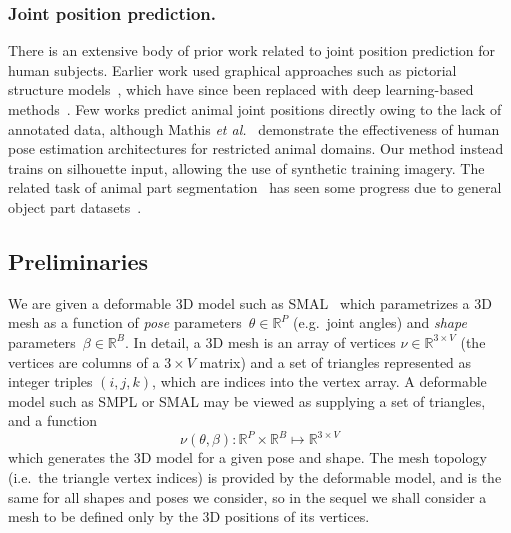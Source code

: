\subsubsection*{Joint position prediction.} There is an extensive body of prior work related to joint position prediction for human subjects. Earlier work used graphical approaches such as pictorial structure models~\cite{andriluka2010monocular,pishchulin2013poselet,johnson2010clustered}, which have since been replaced with deep learning-based methods~\cite{cao2017realtime,bulat2016human}. Few works predict animal joint positions directly owing to the lack of annotated data, although Mathis {\em et al.}~\cite{mathis2018deeplabcut} demonstrate the effectiveness of human pose estimation architectures for restricted animal domains. Our method instead trains on silhouette input, allowing the use of synthetic training imagery. The related task of animal part segmentation~\cite{wang2015joint,wang2015semantic} has seen some progress due to general object part datasets~\cite{chen_cvpr14,zhou2017scene}.

\subsection{Preliminaries}
\def\R#1{{\mathbb{R}^{#1}}}
\def\RR#1#2{{\mathbb{R}^{#1 \times #2}}}
\def\posn{\phi}
\def\pose{\theta}
\def\npose{P}
\def\shape{\beta}
\def\nshape{B}
\def\verts{\nu}
\def\nverts{V}
\def\jointselect{\mathtt{K}}
\def\njoints{J}
We are given a deformable 3D model such as SMAL~\cite{zuffi2017menagerie} which parametrizes a 3D mesh as a function of {\em pose} parameters~$\pose \in \R\npose$ (e.g.\ joint angles) and {\em shape} parameters~$\shape \in \R\nshape$. 
In detail, a 3D mesh is an array of vertices $\verts \in \RR 3\nverts$ (the vertices are columns of a $3 \times \nverts$ matrix) and a set of triangles represented as integer triples $(i,j,k)$, which are indices into the vertex array.
A deformable model such as SMPL or SMAL may be viewed as supplying a set of triangles, and a function
\begin{equation}
\verts(\pose, \shape) : \R \npose \times \R \nshape \mapsto \RR 3 \nverts
\end{equation}
which generates the 3D model for a given pose and shape.
The mesh topology (i.e.~the triangle vertex indices) is provided by the deformable model, and is the same for all shapes and poses we consider, so in the sequel we shall consider a mesh to be defined only by the 3D positions of its vertices.


